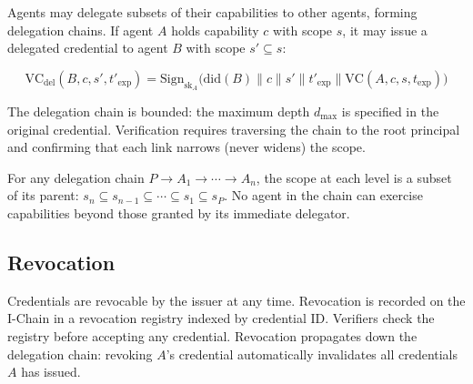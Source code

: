 Agents may delegate subsets of their capabilities to other agents, forming delegation chains. If agent $A$ holds capability $c$ with scope $s$, it may issue a delegated credential to agent $B$ with scope $s' \subseteq s$:

\begin{equation}\label{eq:delegation}
    \text{VC}_{\text{del}}(B, c, s', t'_{\text{exp}}) = \text{Sign}_{\text{sk}_A}\big(\text{did}(B) \| c \| s' \| t'_{\text{exp}} \| \text{VC}(A, c, s, t_{\text{exp}})\big)
\end{equation}

The delegation chain is bounded: the maximum depth $d_{\max}$ is specified in the original credential. Verification requires traversing the chain to the root principal and confirming that each link narrows (never widens) the scope.

\begin{proposition}
For any delegation chain $P \to A_1 \to \cdots \to A_n$, the scope at each level is a subset of its parent: $s_n \subseteq s_{n-1} \subseteq \cdots \subseteq s_1 \subseteq s_P$. No agent in the chain can exercise capabilities beyond those granted by its immediate delegator.
\end{proposition}

\subsection{Revocation}

Credentials are revocable by the issuer at any time. Revocation is recorded on the I-Chain in a revocation registry indexed by credential ID. Verifiers check the registry before accepting any credential. Revocation propagates down the delegation chain: revoking $A$'s credential automatically invalidates all credentials $A$ has issued.

